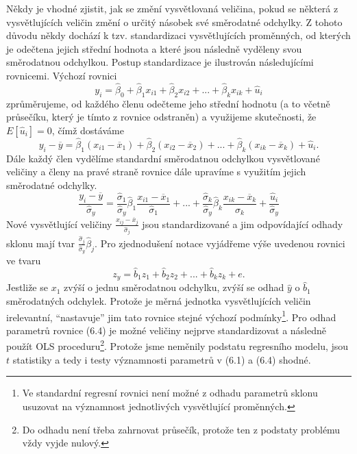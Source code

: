 Někdy je vhodné zjistit, jak se změní vysvětlovaná veličina, pokud se některá z vysvětlujících veličin změní o určitý násobek své 
směrodatné odchylky. Z tohoto důvodu někdy dochází k tzv. standardizaci vysvětlujících proměnných, od kterých je odečtena jejich 
střední hodnota a které jsou následně vyděleny svou směrodatnou odchylkou. Postup standardizace je ilustrován následujícími rovnicemi. Výchozí rovnici
\begin{equation}
y_i = \hat{\beta}_0 + \hat{\beta}_1 x_{i1} + \hat{\beta}_2 x_{i2} + ... + \hat{\beta}_k x_{ik} + \hat{u}_i
\end{equation}
zprůměrujeme, od každého členu odečteme jeho střední hodnotu (a to včetně průsečíku, který je tímto z rovnice odstraněn) a využijeme skutečnosti, že $E[\hat{u}_i] = 0$, čímž dostáváme
\begin{equation}
y_i - \overline{y} = \hat{\beta}_1(x_{i1} - \overline{x}_1) + \hat{\beta}_2(x_{i2} - \overline{x}_2) + ... + \hat{\beta}_k(x_{ik} - \overline{x}_k) + 
\hat{u}_i.
\end{equation}
Dále každý člen vydělíme standardní směrodatnou odchylkou vysvětlované veličiny a členy na pravé straně rovnice dále upravíme s 
využitím jejich směrodatné odchylky.
\begin{equation}
\frac{y_i - \overline{y}}{\hat{\sigma}_y} = \frac{\hat{\sigma}_1}{\hat{\sigma}_y}\hat{\beta}_1 \frac{x_{i1} - 
\overline{x}_1}{\hat{\sigma}_1} + ... + \frac{\hat{\sigma}_k}{\hat{\sigma}_y}\hat{\beta}_k \frac{x_{ik} - 
\overline{x}_k}{\hat{\sigma}_k} + \frac{\hat{u}_i}{\hat{\sigma}_y}
\end{equation}
Nové vysvětlující veličiny $\frac{x_{ij} - \overline{x}_j}{\hat{\sigma}_j}$ jsou standardizované a jim odpovídající odhady sklonu mají 
tvar $\frac{\hat{\sigma}_j}{\hat{\sigma}_y}\hat{\beta}_j$. Pro zjednodušení notace vyjádřeme výše uvedenou rovnici ve tvaru
\begin{equation}
z_y = \hat{b}_1 z_1 + \hat{b}_2 z_2 + ... + \hat{b}_k z_k + e.
\end{equation}
Jestliže se $x_1$ zvýší o jednu směrodatnou odchylku, zvýší se odhad $\hat{y}$ o $\hat{b}_1$ směrodatných odchylek. Protože je měrná 
jednotka vysvětlujících veličin irelevantní, ``nastavuje'' jim tato rovnice stejné výchozí podmínky\footnote{Ve standardní regresní 
rovnici není možné z odhadu parametrů sklonu usuzovat na významnost jednotlivých vysvětlující proměnných.}. Pro odhad parametrů rovnice 
(6.4) je možné veličiny nejprve standardizovat a následně použít OLS proceduru\footnote{Do odhadu není třeba zahrnovat průsečík, protože 
ten z podstaty problému vždy vyjde nulový.}. Protože jsme neměnily podstatu regresního modelu, jsou $t$ statistiky a tedy i testy významnosti 
parametrů  v (6.1) a (6.4) shodné.

